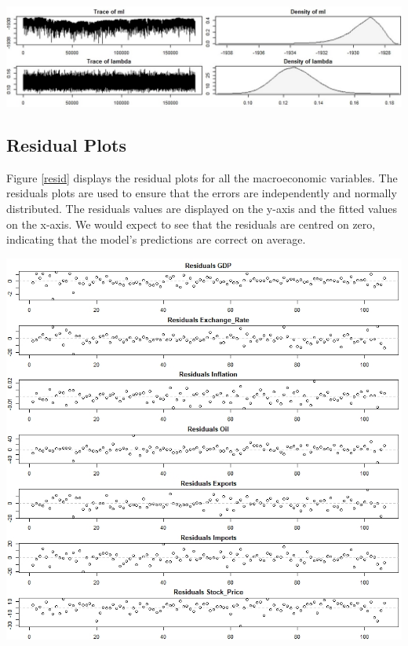 \documentclass[11pt,preprint, authoryear]{elsarticle}
\let\origfigure\figure
\let\endorigfigure\endfigure
\renewenvironment{figure}[1][2] {
    \expandafter\origfigure\expandafter[H]
} {
    \endorigfigure
}
\numberwithin{equation}{section}
\numberwithin{figure}{section}
\numberwithin{table}{section}
\begin{document}
\begin{figure}[h]
\centering
\includegraphics[width=\linewidth]{traced.jpg}
\caption{Trace and density plot of the maximum likelihood and the hierarchical hyperparameters }
\label{mcmc}
\end{figure}

\hypertarget{residual-plots}{%
\subsection{Residual Plots}\label{residual-plots}}

Figure \ref{resid} displays the residual plots for all the macroeconomic
variables. The residuals plots are used to ensure that the errors are
independently and normally distributed. The residuals values are
displayed on the y-axis and the fitted values on the x-axis. We would
expect to see that the residuals are centred on zero, indicating that
the model's predictions are correct on average.

\begin{figure}[h]
\centering
\includegraphics[width=\linewidth]{resid.jpg}
\caption{Residual Plots}
\label{resid}
\end{figure}
\end{document}
